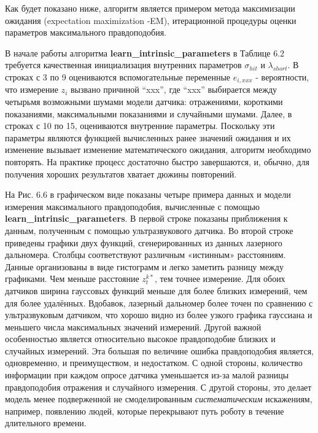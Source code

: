 \documentclass[10pt,a4paper]{article}
\begin{document}
Как будет показано ниже, алгоритм является примером метода  максимизации ожидания (expectation maximization -EM), итерационной процедуры оценки параметров максимального правдоподобия.

В начале работы алгоритма \textbf{learn\_intrinsic\_parameters} в Таблице 6.2 требуется качественная инициализация внутренних параметров $\sigma_{hit}$ и $\lambda_{short}$. В строках с 3 по 9 оцениваются вспомогательные переменные $e_{i,xxx}$ -  вероятности, что измерение  $z_i$ вызвано  причиной “xxx”, где “xxx” выбирается между четырьмя возможными шумами модели датчика: отражениями, короткими показаниями, максимальными показаниями и случайными шумами. Далее, в строках с 10 по 15, оцениваются внутренние параметры. Поскольку эти параметры являются функцией вычисленных ранее значений ожидания и их изменение вызывает изменение математического ожидания, алгоритм необходимо повторять. На практике процесс достаточно быстро завершаются, и, обычно, для получения хороших результатов хватает дюжины повторений. 

На Рис. 6.6 в графическом виде показаны четыре примера данных и модели измерения максимального правдоподобия, вычисленные с помощью \textbf{learn\_intrinsic\_parameters}. В первой строке показаны приближения к данным, полученным с помощью ультразвукового датчика. Во второй строке приведены графики двух функций, сгенерированных из данных лазерного дальномера. Столбцы соответствуют различным «истинным» расстояниям. Данные организованы в виде гистограмм и легко заметить разницу между графиками. Чем меньше расстояние $z_t^{k*}$, тем точнее измерение. Для обоих датчиков ширина гауссовых функций меньше для более близких измерений, чем для более удалённых. Вдобавок, лазерный дальномер более точен по сравнению с ультразвуковым датчиком, что хорошо видно из более узкого графика гауссиана и меньшего числа максимальных значений измерений. Другой важной особенностью является относительно высокое правдоподобие близких и случайных измерений. Эта большая по величине ошибка правдоподобия  является, одновременно, и преимуществом, и недостатком. С одной стороны, количество информации при каждом опросе датчика уменьшается из-за малой  разницы правдоподобия отражения и случайного измерения. С другой стороны, это делает модель менее подверженной не смоделированным \textit{систематическим} искажениям, например, появлению людей, которые перекрывают путь роботу в течение длительного времени. 
\end{document}
